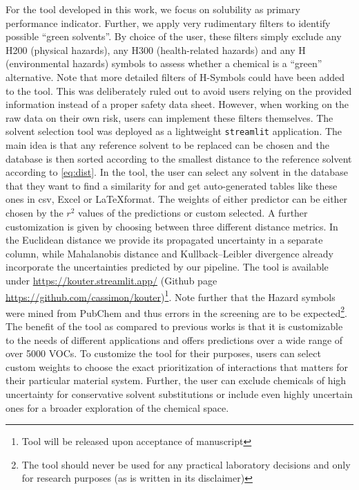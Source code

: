 \documentclass[
  english,        %
  font=times,     %
  onecolumn,      %
]{article}
\begin{document}
For the tool developed in this work, we focus on solubility as primary performance indicator. Further, we apply very rudimentary filters to identify possible “green solvents”. By choice of the user, these filters simply exclude any H200 (physical hazards), any H300 (health-related hazards) and any H (environmental hazards) symbols to assess whether a chemical is a “green” alternative. Note that more detailed filters of H-Symbols could have been added to the tool. This was deliberately ruled out to avoid users relying on the provided information instead of a proper safety data sheet. However, when working on the raw data on their own risk, users can implement these filters themselves. The solvent selection tool was deployed as a lightweight \texttt{streamlit} application. The main idea is that any reference solvent to be replaced can be chosen and the database is then sorted according to the smallest distance to the reference solvent according to \cref{eq:dist}.  In the tool, the user can select any solvent in the database that they want to find a similarity for and get auto-generated tables like these ones in csv, Excel or \LaTeX format. The weights of either predictor can be either chosen by the $r^2$ values of the predictions or custom selected. A further customization is given by choosing between three different distance metrics. In the Euclidean distance we provide its propagated uncertainty in a separate column, while Mahalanobis distance and Kullback–Leibler divergence already incorporate the uncertainties predicted by our pipeline. The tool is available under \url{https://kouter.streamlit.app/} (Github page \url{https://github.com/cassimon/kouter})\footnote{Tool will be released upon acceptance of manuscript}. Note further that the Hazard symbols were mined from PubChem and thus errors in the screening are to be expected\footnote{The tool should never be used for any practical laboratory decisions and only for research purposes (as is written in its disclaimer)}. The benefit of the tool as compared to previous works is that it is customizable to the needs of different applications and offers predictions over a wide range of over 5000 VOCs. To customize the tool for their purposes, users can select custom weights to choose the exact prioritization of interactions that matters for their particular material system. Further, the user can exclude chemicals of high uncertainty for conservative solvent substitutions or include even highly uncertain ones for a broader exploration of the chemical space. %
\end{document}
